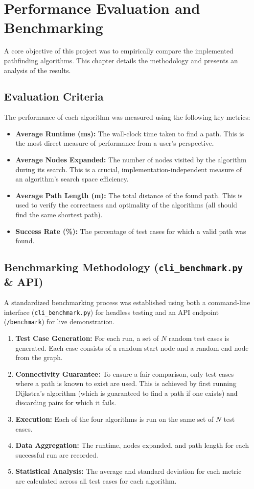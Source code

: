 \documentclass[12pt, a4paper]{report}
\begin{document}
\clearpage
\chapter{Performance Evaluation and Benchmarking}

A core objective of this project was to empirically compare the implemented pathfinding algorithms. This chapter details the methodology and presents an analysis of the results.

\section{Evaluation Criteria}
The performance of each algorithm was measured using the following key metrics:
\begin{itemize}
    \item \textbf{Average Runtime (ms):} The wall-clock time taken to find a path. This is the most direct measure of performance from a user's perspective.
    \item \textbf{Average Nodes Expanded:} The number of nodes visited by the algorithm during its search. This is a crucial, implementation-independent measure of an algorithm's search space efficiency.
    \item \textbf{Average Path Length (m):} The total distance of the found path. This is used to verify the correctness and optimality of the algorithms (all should find the same shortest path).
    \item \textbf{Success Rate (\%):} The percentage of test cases for which a valid path was found.
\end{itemize}

\section{Benchmarking Methodology (\texttt{cli\_benchmark.py} \& API)}
A standardized benchmarking process was established using both a command-line interface (\texttt{cli\_benchmark.py}) for headless testing and an API endpoint (\texttt{/benchmark}) for live demonstration.
\begin{enumerate}
    \item \textbf{Test Case Generation:} For each run, a set of $N$ random test cases is generated. Each case consists of a random start node and a random end node from the graph.
    \item \textbf{Connectivity Guarantee:} To ensure a fair comparison, only test cases where a path is known to exist are used. This is achieved by first running Dijkstra's algorithm (which is guaranteed to find a path if one exists) and discarding pairs for which it fails.
    \item \textbf{Execution:} Each of the four algorithms is run on the same set of $N$ test cases.
    \item \textbf{Data Aggregation:} The runtime, nodes expanded, and path length for each successful run are recorded.
    \item \textbf{Statistical Analysis:} The average and standard deviation for each metric are calculated across all test cases for each algorithm.
\end{enumerate}
\end{document}
